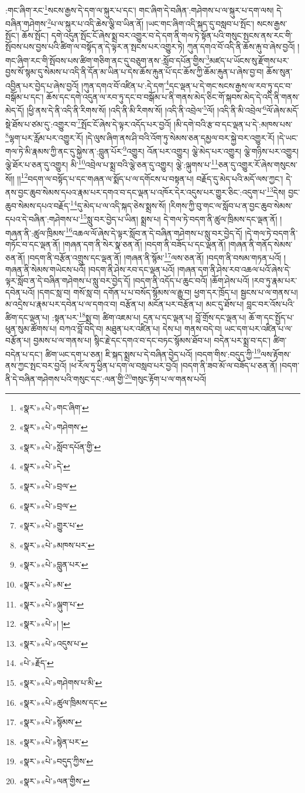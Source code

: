 :གང་ཞིག་རང་\footnote{«སྣར་»«པེ་»གང་ཞིག་}སངས་རྒྱས་དེ་དག་ལ་སྐུར་པ་དང་། གང་ཞིག་དེ་བཞིན་:གཤེགས་པ་ལ་སྐུར་པ་དག་ལས། དེ་བཞིན་གཤེགས་\footnote{«སྣར་»«པེ་»གཤེགས་}པ་ལ་སྐུར་པ་འདི་ཆེས་ལྕི་བ་ཡིན་ནོ། །ཡང་གང་ཞིག་འདི་སྐད་དུ་བསླབ་པ་སྤོང་། སངས་རྒྱས་སྤོང་། ཆོས་སྤོང་། དགེ་འདུན་སྤོང་ངོ་ཞེས་སྨྲ་བར་འགྱུར་བ་དེ་དག་ནི་གལ་ཏེ་སྟོན་པའི་གསུང་སྤངས་ནས་རང་གི་སྤོབས་པས་བྱས་པའི་ཚིག་ལ་བསྟོད་ན་དེ་ལྟར་ན་སྤངས་པར་འགྱུར་ཏེ། ཀུན་དགའ་བོ་འདི་ནི་ཆོས་རྐུ་བ་ཞེས་བྱའོ། །གང་ཞིག་རང་གི་སྤོབས་པས་ཚིག་གཅིག་ནང་དུ་བཅུག་ནས་:སློབ་དཔོན་གྱིས་\footnote{«སྣར་»«པེ་»སློབ་དཔོན་གྱི་}མཛད་པ་ཡོངས་སུ་རྫོགས་པར་བྱས་སོ་སྙམ་དུ་སེམས་པ་འདི་ནི་དོན་མ་ཡིན་པ་དེས་ཆོས་རྐུན་པོ་དང་ཆོས་ཀྱི་ཆོམ་རྐུན་པ་ཞེས་བྱ་བ། ཆོས་སུན་འབྱིན་པར་བྱེད་པ་ཞེས་བྱའོ། །ཀུན་དགའ་བོ་འཛིན་པ་:དེ་དག་\footnote{«སྣར་»«པེ་»དེ་}དང་ལྡན་པ་དེ་གང་སངས་རྒྱས་ལ་རབ་ཏུ་དང་བ་བསྒོམ་པ་དང་། ཆོས་དང་དགེ་འདུན་ལ་རབ་ཏུ་དང་བ་བསྒོམ་པ་ནི་གནས་མེད་ཅིང་གོ་སྐབས་མེད་དེ་འདི་ནི་གནས་མེད་དོ། །ཕྱི་ནས་དེ་ནི་འདི་ནི་རིགས་སོ། །འདི་ནི་མི་རིགས་སོ། །འདི་ནི་འབྲེལ་\footnote{«སྣར་»«པེ་»བྲལ་}ལོ། །འདི་ནི་མི་འབྲེལ་\footnote{«སྣར་»«པེ་»བྲལ་}ལོ་ཞེས་མདོ་སྡེ་ཐོས་པ་ཙམ་དུ་:འགྱུར་བ་\footnote{«སྣར་»«པེ་»གྱུར་པ་}སྤོང་ངོ་ཞེས་དེ་ལྟར་འདོད་པར་བྱའོ། །མི་དགེ་བའི་རྩ་བ་དང་ལྡན་པ་དེ་:མཁས་པས་\footnote{«སྣར་»«པེ་»མཁས་པར་}ལྷག་པར་རློམ་པར་འགྱུར་རོ། །དེ་ལུས་ཞིག་ནས་ཤི་བའི་འོག་ཏུ་སེམས་ཅན་དམྱལ་བར་སྐྱེ་བར་འགྱུར་རོ། །དེ་ཡང་གལ་ཏེ་མི་རྣམས་ཀྱི་ནང་དུ་སྐྱེས་ན་:བླུན་པོར་\footnote{«སྣར་»«པེ་»བླུན་པར་}འགྱུར། འོན་པར་འགྱུར། ལྕེ་མེད་པར་འགྱུར། ལྕེ་གཉིས་པར་འགྱུར། ལྕེ་ཐོར་པ་ཅན་དུ་འགྱུར། མི་\footnote{«སྣར་»«པེ་»མ་}འབྲེལ་པ་སྨྲ་བའི་ལྕེ་ཅན་དུ་འགྱུར། ལྕེ་:ལྐུགས་པ་\footnote{«སྣར་»«པེ་»ལྐུག་པ་}ཅན་དུ་འགྱུར་རོ་ཞེས་གསུངས་སོ།། །།\footnote{«སྣར་»«པེ་»། །}བདག་ལ་བསྟོད་པ་དང་གཞན་ལ་སྨོད་པ་ལ་དགོངས་པ་བསྟན་པ། བརྗོད་དུ་མེད་པའི་མདོ་ལས་ཀྱང་། དེ་ནས་བྱང་ཆུབ་སེམས་དཔའ་རྣམ་པར་དགའ་བ་དང་ལྡན་པ་འཁོར་དེར་འདུས་པར་གྱུར་ཅིང་:འདུག་པ་\footnote{«སྣར་»«པེ་»འདུས་པ་}དེས། བྱང་ཆུབ་སེམས་དཔའ་བརྗོད་\footnote{«པེ་»རྗོད་}དུ་མེད་པ་ལ་འདི་སྐད་ཅེས་སྨྲས་སོ། །རིགས་ཀྱི་བུ་གང་ལ་སློབ་པ་ན་བྱང་ཆུབ་སེམས་དཔའ་དེ་བཞིན་:གཤེགས་པ་\footnote{«སྣར་»«པེ་»གཤེགས་པ་མི་}སླུ་བར་བྱེད་པ་ཡིན། སྨྲས་པ། དེ་གལ་ཏེ་བདག་ནི་ཚུལ་ཁྲིམས་དང་ལྡན་ནོ། །གཞན་ནི་:ཚུལ་ཁྲིམས་\footnote{«སྣར་»«པེ་»ཚུལ་ཁྲིམས་དང་}འཆལ་ལོ་ཞེས་དེ་ལྟར་སློབ་ན་དེ་བཞིན་གཤེགས་པ་སླུ་བར་བྱེད་དོ། །དེ་གལ་ཏེ་བདག་ནི་གཏོང་བ་དང་ལྡན་ནོ། །གཞན་དག་ནི་སེར་སྣ་ཅན་ནོ། །བདག་ནི་བཟོད་པ་དང་ལྡན་ནོ། །གཞན་ནི་གནོད་སེམས་ཅན་ནོ། །བདག་ནི་བརྩོན་འགྲུས་དང་ལྡན་ནོ། །གཞན་ནི་སྙོམ་\footnote{«སྣར་»«པེ་»སྙོམས་}ལས་ཅན་ནོ། །བདག་ནི་བསམ་གཏན་པའོ། །གཞན་ནི་སེམས་གཡེངས་པའོ། །བདག་ནི་ཤེས་རབ་དང་ལྡན་པའོ། །གཞན་དག་ནི་ཤེས་རབ་འཆལ་པའོ་ཞེས་དེ་ལྟར་སློབ་ན་དེ་བཞིན་གཤེགས་པ་སླུ་བར་བྱེད་དོ། །བདག་ནི་འདོད་པ་ཆུང་བའོ། །ཆོག་ཤེས་པའོ། །རབ་ཏུ་རྣམ་པར་དབེན་པའོ། །དགང་སླ་བ། གསོ་སླ་བ། དགོན་པ་པ་བསོད་སྙོམས་ལ་རྒྱུ་བ། ཕྱག་དར་ཁྲོད་པ། སྦྱངས་པ་ལ་གནས་པ། མ་འདྲེས་པ་རྣམ་པར་དབེན་པ་ལ་དགའ་བ། བརྩོན་པ། མངོན་པར་བརྩོན་པ། མང་དུ་ཐོས་པ། བླང་བར་འོས་པའི་ཚིག་དང་ལྡན་པ། :སྟན་པར་\footnote{«སྣར་»«པེ་»སྙེན་པར་}སྨྲ་བ། ཚིག་འཇམ་པ། དྲན་པ་དང་ལྡན་པ། བློ་གྲོས་དང་ལྡན་པ། ཆོ་ག་དང་སྤྱོད་པ་ཕུན་སུམ་ཚོགས་པ། བཀའ་བློ་བདེ་བ། མཐུན་པར་འཛིན་པ། དེས་པ། གནས་བདེ་བ། ཡང་དག་པར་འཛིན་པ་ལ་བརྩོན་པ། བྱམས་པ་ལ་གནས་པ། སྙིང་རྗེ་དང་དགའ་བ་དང་བཏང་སྙོམས་ཐོབ་པ། བདེན་པར་སྨྲ་བ་དང་། ཚིག་བདེན་པ་དང་། ཚིག་ཡང་དག་པ་ཅན། ཇི་སྐད་སྨྲས་པ་དེ་བཞིན་བྱེད་པའོ། །བདག་གིས་:བདུད་ཀྱི་\footnote{«སྣར་»«པེ་»བདུད་ཀྱིས་}ལས་རྟོགས་ནས་ཀྱང་སྤང་བར་བྱའོ། །ཕ་རོལ་ཏུ་ཕྱིན་པ་དག་ལ་བསླབ་པར་བྱའོ། །བདག་ནི་ཟབ་མོ་ལ་བཟོད་པ་ཅན་ནོ། །བདག་ནི་དེ་བཞིན་གཤེགས་པའི་གསུང་དང་:ལན་གྱི་\footnote{«སྣར་»«པེ་»ལན་གྱིས་}གསུང་རྟོག་པ་ལ་གནས་པའོ། 